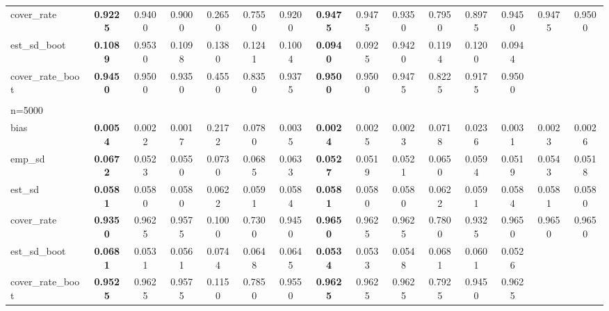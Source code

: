 \documentclass[11pt]{article}
\numberwithin{equation}{section}
\begin{document}
\begin{table}[]
{\begin{tabular}{lcccccccccccccc}
			cover\_rate & \textbf{0.9225} & 0.9400 & 0.9000 & 0.2650 & 0.7550 & 0.9200 & \textbf{0.9475} & 0.9475 & 0.9350 & 0.7950 & 0.8975 & 0.9450 & 0.9475 & 0.9500 \\
			est\_sd\_boot & \textbf{0.1089} & 0.9530 & 0.1098 & 0.1380 & 0.1241 & 0.1004 & \textbf{0.0940} & 0.0925 & 0.9420 & 0.1194 & 0.1200 & 0.0944 &  &  \\
			cover\_rate\_boot & \textbf{0.9450} & 0.9500 & 0.9350 & 0.4550 & 0.8350 & 0.9375 & \textbf{0.9500} & 0.9500 & 0.9475 & 0.8225 & 0.9175 & 0.9500 &  &  \\
			\\
			n=5000 &  &  &  &  &  &  &  &  &  &  &  &  &  &  \\
			\hline
			bias & \textbf{0.0054} & 0.0022 & 0.0017 & 0.2172 & 0.0780 & 0.0035 & \textbf{0.0024} & 0.0025 & 0.0023 & 0.0718 & 0.0236 & 0.0031 & 0.0023 & 0.0026 \\
			emp\_sd & \textbf{0.0672} & 0.0523 & 0.0550 & 0.0730 & 0.0685 & 0.0633 & \textbf{0.0527} & 0.0519 & 0.0521 & 0.0650 & 0.0594 & 0.0519 & 0.0543 & 0.0518 \\
			est\_sd & \textbf{0.0581} & 0.0580 & 0.0580 & 0.0622 & 0.0591 & 0.0584 & \textbf{0.0581} & 0.0580 & 0.0580 & 0.0622 & 0.0591 & 0.0584 & 0.0581 & 0.0580 \\
			cover\_rate & \textbf{0.9350} & 0.9625 & 0.9575 & 0.1000 & 0.7300 & 0.9450 & \textbf{0.9650} & 0.9625 & 0.9625 & 0.7800 & 0.9325 & 0.9650 & 0.9650 & 0.9650 \\
			est\_sd\_boot & \textbf{0.0681} & 0.0531 & 0.0561 & 0.0744 & 0.0648 & 0.0645 & \textbf{0.0534} & 0.0533 & 0.0548 & 0.0681 & 0.0601 & 0.0526 &  &  \\
			cover\_rate\_boot & \textbf{0.9525} & 0.9625 & 0.9575 & 0.1150 & 0.7850 & 0.9550 & \textbf{0.9625} & 0.9625 & 0.9625 & 0.7925 & 0.9450 & 0.9625 &  &\\
			\hline
		\end{tabular}
		\label{tab:simu_average_att_p10_2}
	}
	
\end{table}
\end{document}
